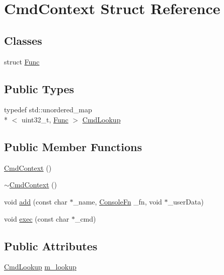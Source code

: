 \hypertarget{struct_cmd_context}{\section{Cmd\+Context Struct Reference}
\label{struct_cmd_context}
}
\subsection*{Classes}
\begin{DoxyCompactItemize}
\item 
struct \hyperlink{struct_cmd_context_1_1_func}{Func}
\end{DoxyCompactItemize}
\subsection*{Public Types}
\begin{DoxyCompactItemize}
\item 
typedef std\+::unordered\+\_\+map\\*
$<$ uint32\+\_\+t, \hyperlink{struct_cmd_context_1_1_func}{Func} $>$ \hyperlink{struct_cmd_context_a47ec0f8cf01b96bc33de0be67659f887}{Cmd\+Lookup}
\end{DoxyCompactItemize}
\subsection*{Public Member Functions}
\begin{DoxyCompactItemize}
\item 
\hyperlink{struct_cmd_context_aea23939ff98d098e5113192c6fb7e9e7}{Cmd\+Context} ()
\item 
\hyperlink{struct_cmd_context_a1d9b1522b1980e7c494dde1c28c3b47d}{$\sim$\+Cmd\+Context} ()
\item 
void \hyperlink{struct_cmd_context_abd3af3bdd8c23e8582fe661755328b74}{add} (const char $\ast$\+\_\+name, \hyperlink{cmd_8h_aaab80fbdebf67debb124e449ae502c99}{Console\+Fn} \+\_\+fn, void $\ast$\+\_\+user\+Data)
\item 
void \hyperlink{struct_cmd_context_ad60de9c132d30ee99608ee14583b5ddb}{exec} (const char $\ast$\+\_\+cmd)
\end{DoxyCompactItemize}
\subsection*{Public Attributes}
\begin{DoxyCompactItemize}
\item 
\hyperlink{struct_cmd_context_a47ec0f8cf01b96bc33de0be67659f887}{Cmd\+Lookup} \hyperlink{struct_cmd_context_abcd5c9d13d5991216e20efec0ada6a93}{m\+\_\+lookup}
\end{DoxyCompactItemize}


